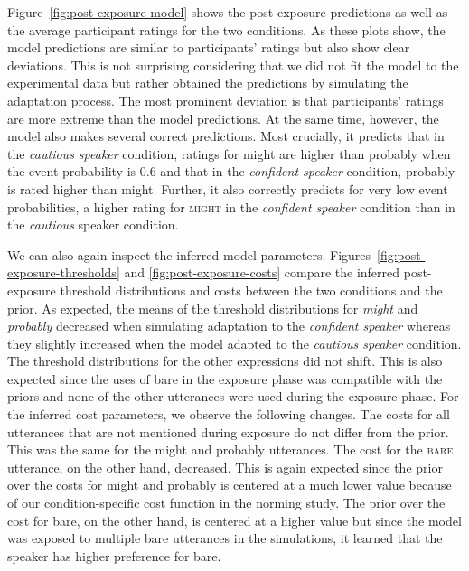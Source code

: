 \documentclass[lucida,biblatex]{sp} %
\begin{document}
Figure~\ref{fig:post-exposure-model} shows the post-exposure predictions as well as the average participant ratings for the two conditions. As these plots show, the model
predictions are similar to participants' ratings but also show clear deviations. This is not surprising considering that we did not fit the model to the experimental data  but
rather obtained the predictions by simulating the adaptation process. The most prominent deviation is that  participants' ratings are more extreme than the model predictions. 
At the same time, however, the model also makes several correct predictions. Most crucially, it predicts that in the \textit{cautious speaker} condition, ratings for {\sc might} are higher than {\sc probably} when
the event probability is 0.6 and that in the \textit{confident speaker} condition, {\sc probably}  is rated higher than {\sc might}. Further, it also correctly predicts for very low
event probabilities, a higher rating for \textsc{might} in the \textit{confident speaker} condition than in the \textit{cautious} speaker condition.

We can also again inspect the inferred model parameters. Figures~\ref{fig:post-exposure-thresholds} and \ref{fig:post-exposure-costs} compare the inferred
post-exposure threshold distributions and costs between the two conditions and the prior. As expected, the means of the threshold distributions for \textit{might} and \textit{probably} 
decreased when simulating adaptation to the \textit{confident speaker} whereas they slightly increased when the model adapted to the \textit{cautious speaker} condition.
The threshold distributions for the other expressions did not shift. This is also expected since the uses of {\sc bare} in the exposure phase was compatible with the priors and
none of the other utterances were used during the exposure phase. For the inferred cost parameters, we observe the following changes. The costs for all utterances that are not mentioned
during exposure do not differ from the prior. This was the same for the  { \sc might} and {\sc probably} utterances. The cost for the \textsc{bare} utterance, on the other hand, decreased.
This is again expected since the prior over the costs for {\sc might} and {\sc probably} is centered at a much lower value because of 
our condition-specific cost function in the norming study. The prior over the cost for {\sc bare}, on the other hand, is centered at a higher value but since the model was
exposed to multiple {\sc bare} utterances in the simulations, it learned that the speaker has higher preference for {\sc bare}.
\end{document}
